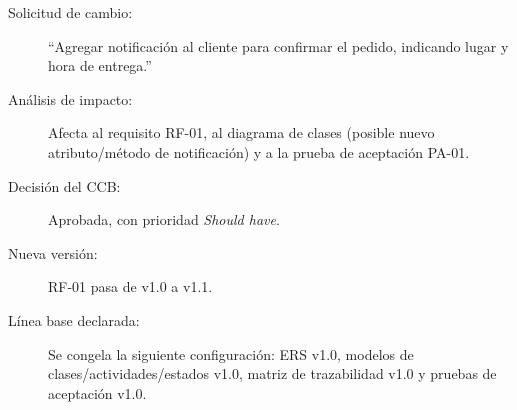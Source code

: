 \documentclass[11pt,a4paper]{article}
\begin{document}
\begin{description}
    \item[Solicitud de cambio:] ``Agregar notificación al cliente para confirmar el pedido, indicando lugar y hora de entrega.''
    \item[Análisis de impacto:] Afecta al requisito RF-01, al diagrama de clases (posible nuevo atributo/método de notificación) y a la prueba de aceptación PA-01.
    \item[Decisión del CCB:] Aprobada, con prioridad \emph{Should have}.
    \item[Nueva versión:] RF-01 pasa de v1.0 a v1.1.
    \item[Línea base declarada:] Se congela la siguiente configuración: ERS v1.0, modelos de clases/actividades/estados v1.0, matriz de trazabilidad v1.0 y pruebas de aceptación v1.0.
\end{description}
\end{document}
